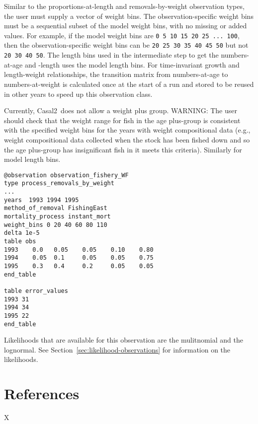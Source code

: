 \documentclass[a4paper,11pt,twoside,pdftex,draft]{article}
\newcommand{\CNAME}{Casal2}
\begin{document}
Similar to the proportions-at-length and removals-by-weight observation types, the user must supply a vector of weight bins. The observation-specific weight bins must be a sequential subset of the model weight bins, with no missing or added values. For example, if the model weight bins are \texttt{0 5 10 15 20 25 ... 100}, then the observation-specific weight bins can be \texttt{20 25 30 35 40 45 50} but not \texttt{20 30 40 50}. The length bins used in the intermediate step to get the numbers-at-age and -length uses the model length bins. For time-invariant growth and length-weight relationships, the transition matrix from numbers-at-age to numbers-at-weight is calculated once at the start of a run and stored to be reused in other years to speed up this observation class.

Currently, \CNAME~does not allow a weight plus group. WARNING: The user should check that the weight range for fish in the age plus-group is consistent with the specified weight bins for the years with weight compositional data (e.g., weight compositional data collected when the stock has been fished down and so the age plus-group has insignificant fish in it meets this criteria). Similarly for model length bins.

{\small{\begin{verbatim}
@observation observation_fishery_WF
type process_removals_by_weight
...
years  1993 1994 1995
method_of_removal FishingEast
mortality_process instant_mort
weight_bins 0 20 40 60 80 110
delta 1e-5
table obs
1993    0.0   0.05    0.05    0.10    0.80
1994    0.05  0.1     0.05    0.05    0.75
1995    0.3   0.4     0.2     0.05    0.05
end_table

table error_values
1993 31
1994 34
1995 22
end_table
\end{verbatim}}}

Likelihoods that are available for this observation are the mulitnomial and the lognormal. See Section~\ref{sec:likelihood-observations} for information on the  likelihoods.

\section{References}

X
\end{document}
